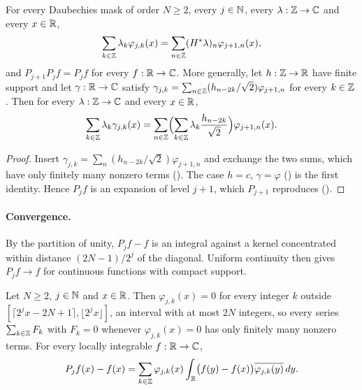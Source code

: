 \begin{proposition}
\label{prop:daub-expand-succ}
\leanok
{}
For every Daubechies mask of order $N \geq 2$, every $j \in \mathbb{N}$, every $\lambda : \mathbb{Z} \to \mathbb{C}$ and
every $x \in \mathbb{R}$,
\[
  \sum_{k \in \mathbb{Z}} \lambda_k \varphi_{j,k}(x) = \sum_{n \in \mathbb{Z}} (H^* \lambda)_n \varphi_{j+1,n}(x) ,
\]
and $P_{j+1} P_j f = P_j f$ for every $f : \mathbb{R} \to \mathbb{C}$. More generally, let $h : \mathbb{Z} \to \mathbb{R}$ have
finite support and let $\gamma : \mathbb{R} \to \mathbb{C}$ satisfy
$\gamma_{j,k} = \sum_{n \in \mathbb{Z}} (h_{n-2k}/\sqrt 2) \varphi_{j+1,n}$ for every $k \in \mathbb{Z}$. Then
for every $\lambda : \mathbb{Z} \to \mathbb{C}$ and every $x \in \mathbb{R}$,
\[
  \sum_{k \in \mathbb{Z}} \lambda_k \gamma_{j,k}(x)
  = \sum_{n \in \mathbb{Z}} \Bigl(\sum_{k \in \mathbb{Z}} \lambda_k \frac{h_{n-2k}}{\sqrt 2}\Bigr)
    \varphi_{j+1,n}(x) .
\]
\end{proposition}

\begin{proof}
\leanok
{}
Insert $\gamma_{j,k} = \sum_n (h_{n-2k}/\sqrt 2) \varphi_{j+1,n}$ and exchange the two sums,
which have only finitely many nonzero terms (). The case $h = c$,
$\gamma = \varphi$ () is the first identity. Hence $P_j f$ is an
expansion of level $j + 1$, which $P_{j+1}$ reproduces ().
\end{proof}

\paragraph{Convergence.}
By the partition of unity, $P_j f - f$ is an integral against a kernel concentrated within
distance $(2N - 1)/2^j$ of the diagonal. Uniform continuity then gives $P_j f \to f$ for
continuous functions with compact support.

\begin{lemma}
\label{lem:daub-kernel-form}
\leanok
{}
Let $N \geq 2$, $j \in \mathbb{N}$ and $x \in \mathbb{R}$. Then $\varphi_{j,k}(x) = 0$ for every integer $k$
outside $[\lceil 2^j x - 2N + 1 \rceil, \lfloor 2^j x \rfloor]$, an interval with at most $2N$
integers, so every series $\sum_{k \in \mathbb{Z}} F_k$ with $F_k = 0$ whenever $\varphi_{j,k}(x) = 0$
has only finitely many nonzero terms. For every locally integrable $f : \mathbb{R} \to \mathbb{C}$,
\[
  P_j f(x) - f(x) = \sum_{k \in \mathbb{Z}} \varphi_{j,k}(x)
    \int_{\mathbb{R}} \bigl(f(y) - f(x)\bigr) \overline{\varphi_{j,k}(y)} \, dy .
\]
\end{lemma}

